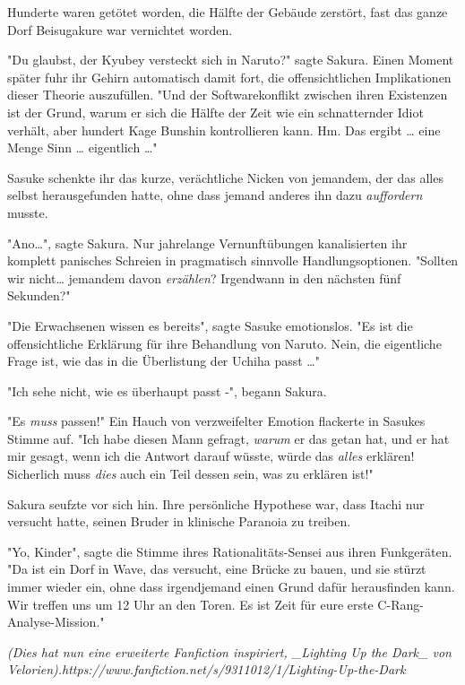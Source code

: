 {Hunderte waren getötet worden, die Hälfte der Gebäude zerstört, fast das ganze Dorf Beisugakure war vernichtet worden.

"Du glaubst, der Kyubey versteckt sich in Naruto?" sagte Sakura. Einen Moment später fuhr ihr Gehirn automatisch damit fort, die offensichtlichen Implikationen dieser Theorie auszufüllen. "Und der Softwarekonflikt zwischen ihren Existenzen ist der Grund, warum er sich die Hälfte der Zeit wie ein schnatternder Idiot verhält, aber hundert Kage Bunshin kontrollieren kann. Hm. Das ergibt … eine Menge Sinn … eigentlich …"

Sasuke schenkte ihr das kurze, verächtliche Nicken von jemandem, der das alles selbst herausgefunden hatte, ohne dass jemand anderes ihn dazu \emph{auffordern} musste.

"Ano…", sagte Sakura. Nur jahrelange Vernunftübungen kanalisierten ihr komplett panisches Schreien in pragmatisch sinnvolle Handlungsoptionen. "Sollten wir nicht… jemandem davon \emph{erzählen}? Irgendwann in den nächsten fünf Sekunden?"

"Die Erwachsenen wissen es bereits", sagte Sasuke emotionslos. "Es ist die offensichtliche Erklärung für ihre Behandlung von Naruto. Nein, die eigentliche Frage ist, wie das in die Überlistung der Uchiha passt …"

"Ich sehe nicht, wie es überhaupt passt -", begann Sakura.

"Es \emph{muss} passen!" Ein Hauch von verzweifelter Emotion flackerte in Sasukes Stimme auf. "Ich habe diesen Mann gefragt, \emph{warum} er das getan hat, und er hat mir gesagt, wenn ich die Antwort darauf wüsste, würde das \emph{alles} erklären! Sicherlich muss \emph{dies} auch ein Teil dessen sein, was zu erklären ist!"

Sakura seufzte vor sich hin. Ihre persönliche Hypothese war, dass Itachi nur versucht hatte, seinen Bruder in klinische Paranoia zu treiben.

"Yo, Kinder", sagte die Stimme ihres Rationalitäts-Sensei aus ihren Funkgeräten. "Da ist ein Dorf in Wave, das versucht, eine Brücke zu bauen, und sie stürzt immer wieder ein, ohne dass irgendjemand einen Grund dafür herausfinden kann. Wir treffen uns um 12 Uhr an den Toren. Es ist Zeit für eure erste C-Rang-Analyse-Mission."

\emph{\emph{(Dies hat nun eine erweiterte Fanfiction inspiriert, \_Lighting} \emph{Up} \emph{the} \emph{Dark\_ von} \emph{Velorien).https://www.fanfiction.net/s/9311012/1/Lighting-Up-the-Dark}}

}
